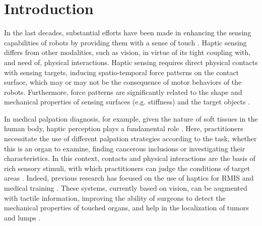 
\section{Introduction}
In the last decades, substantial efforts have been made in enhancing the sensing capabilities 
of robots by providing them with a sense of touch \cite{dahiya_tactile_2010, drimus2014design}. Haptic sensing differs 
from other modalities, such as vision, in virtue of its tight coupling with, and need of, physical interactions. 
Haptic sensing requires direct physical contacts with sensing targets, inducing spatio-temporal force patterns 
on the contact surface, which may or may not be the consequence of motor behaviors of the robots. 
Furthermore, force patterns are significantly related to the shape and mechanical properties of sensing 
surfaces (e.g. stiffness) and the target objects \cite{scimecasoft, fumiya_2016}. 

In medical palpation diagnosis, for example, given the nature of soft tissues in the human body, 
haptic perception plays a fundamental role \cite{puangmali2008state}. 
Here, practitioners necessitate the use of different palpation strategies according to the task, whether 
this is an organ to examine, finding cancerous inclusions or 
investigating their characteristics. In this context, contacts and physical interactions are the basis of rich sensory 
stimuli, with which practitioners can judge the conditions of target areas \cite{palpation1,palpation2,palpation3}.
Indeed, previous research has focused on the use of haptics for RMIS and medical training \cite{mclaughlin2002introduction}. 
These systems, currently based on vision, can be augmented with tactile information, improving the ability of surgeons 
to detect the mechanical properties of touched organs, and help in the localization of tumors and lumps \cite{Liza2014}.

